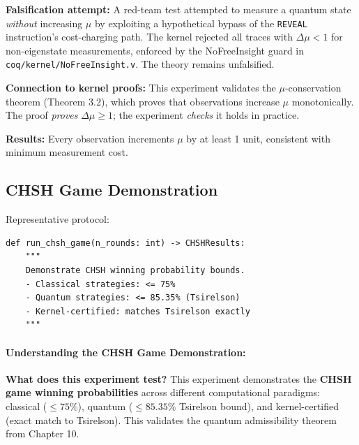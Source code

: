 \textbf{Falsification attempt:} A red-team test attempted to measure a quantum state \textit{without} increasing $\mu$ by exploiting a hypothetical bypass of the \texttt{REVEAL} instruction's cost-charging path. The kernel rejected all traces with $\Delta\mu < 1$ for non-eigenstate measurements, enforced by the NoFreeInsight guard in \texttt{coq/kernel/NoFreeInsight.v}. The theory remains unfalsified.

\textbf{Connection to kernel proofs:} This experiment validates the $\mu$-conservation theorem (Theorem 3.2), which proves that observations increase $\mu$ monotonically. The proof \textit{proves} $\Delta\mu \geq 1$; the experiment \textit{checks} it holds in practice.


\textbf{Results:} Every observation increments $\mu$ by at least 1 unit, consistent with minimum measurement cost.

\subsection{CHSH Game Demonstration}

Representative protocol:
\begin{lstlisting}
def run_chsh_game(n_rounds: int) -> CHSHResults:
    """
    Demonstrate CHSH winning probability bounds.
    - Classical strategies: <= 75%
    - Quantum strategies: <= 85.35% (Tsirelson)
    - Kernel-certified: matches Tsirelson exactly
    """
\end{lstlisting}

\paragraph{Understanding the CHSH Game Demonstration:}

\textbf{What does this experiment test?} This experiment demonstrates the \textbf{CHSH game winning probabilities} across different computational paradigms: classical ($\leq 75\%$), quantum ($\leq 85.35\%$ Tsirelson bound), and kernel-certified (exact match to Tsirelson). This validates the quantum admissibility theorem from Chapter 10.

